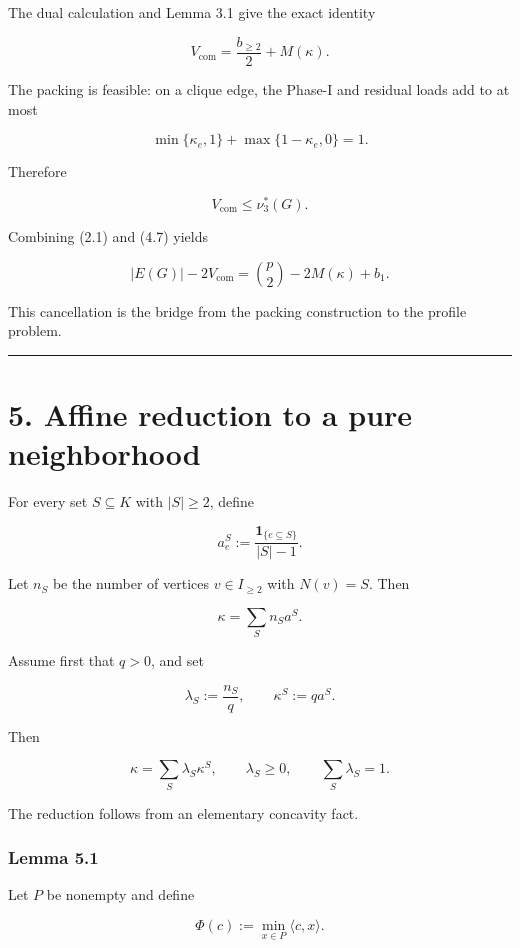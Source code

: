 \documentclass[
  11pt,
]{article}
\begin{document}
The dual calculation and Lemma 3.1 give the exact identity

\[
\boxed{
V_{\mathrm{com}}
=
\frac{b_{\ge2}}2+M(\kappa).
}
\tag{4.7}
\]

The packing is feasible: on a clique edge, the Phase-I and residual
loads add to at most

\[
\min\{\kappa_e,1\}
+
\max\{1-\kappa_e,0\}
=
1.
\]

Therefore

\[
V_{\mathrm{com}}\le\nu_3^*(G).
\tag{4.8}
\]

Combining (2.1) and (4.7) yields

\[
\boxed{
|E(G)|-2V_{\mathrm{com}}
=
\binom{p}{2}-2M(\kappa)+b_1.
}
\tag{4.9}
\]

This cancellation is the bridge from the packing construction to the
profile problem.

\begin{center}\rule{0.5\linewidth}{0.5pt}\end{center}

\section{5. Affine reduction to a pure
neighborhood}\label{affine-reduction-to-a-pure-neighborhood}

For every set \(S\subseteq K\) with \(|S|\ge2\), define

\[
a_e^S
:=
\frac{\mathbf1_{\{e\subseteq S\}}}{|S|-1}.
\tag{5.1}
\]

Let \(n_S\) be the number of vertices \(v\in I_{\ge2}\) with \(N(v)=S\).
Then

\[
\kappa=\sum_Sn_Sa^S.
\tag{5.2}
\]

Assume first that \(q>0\), and set

\[
\lambda_S:=\frac{n_S}{q},
\qquad
\kappa^S:=qa^S.
\]

Then

\[
\kappa=\sum_S\lambda_S\kappa^S,
\qquad
\lambda_S\ge0,
\qquad
\sum_S\lambda_S=1.
\tag{5.3}
\]

The reduction follows from an elementary concavity fact.

\subsubsection{Lemma 5.1}\label{lemma-5.1}

Let \(P\) be nonempty and define

\[
\Phi(c):=\min_{x\in P}\langle c,x\rangle.
\]
\end{document}
